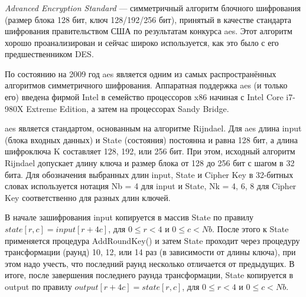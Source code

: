 \subsubsection{}
\label{sec:analysis:research:crypto:aes}

\emph{Advanced Encryption Standard} --- симметричный алгоритм блочного шифрования (размер блока 128 бит, ключ 128/192/256 бит), принятый в качестве стандарта шифрования правительством США по результатам конкурса \gls{aes}. Этот алгоритм хорошо проанализирован и сейчас широко используется, как это было с его предшественником DES. \cite{wiki:aes}

По состоянию на 2009 год \gls{aes} является одним из самых распространённых алгоритмов симметричного шифрования. \cite{thg:aes} Аппаратная поддержка \gls{aes} (и только его) введена фирмой Intel в семейство процессоров x86 начиная с Intel Core i7-980X Extreme Edition, а затем на процессорах Sandy Bridge.

\gls{aes} является стандартом, основанным на алгоритме Rijndael. Для \gls{aes} длина input (блока входных данных) и State (состояния) постоянна и равна 128 бит, а длина шифроключа K составляет 128, 192, или 256 бит. При этом, исходный алгоритм Rijndael допускает длину ключа и размер блока от 128 до 256 бит с шагом в 32 бита. Для обозначения выбранных длин input, State и Cipher Key в 32-битных словах используется нотация Nb = 4 для input и State, Nk = 4, 6, 8 для Cipher Key соответственно для разных длин ключей.

В начале зашифрования input копируется в массив State по правилу \(state[r,c]=input[r+4c]\), для \(0 \leq r < 4\) и \(0 \leq c < Nb\). После этого к State применяется процедура AddRoundKey() и затем State проходит через процедуру трансформации (раунд) 10, 12, или 14 раз (в зависимости от длины ключа), при этом надо учесть, что последний раунд несколько отличается от предыдущих. В итоге, после завершения последнего раунда трансформации, State копируется в output по правилу \(output[r+4c]=state[r,c]\), для \(0 \leq r < 4\) и \(0 \leq c < Nb\).
